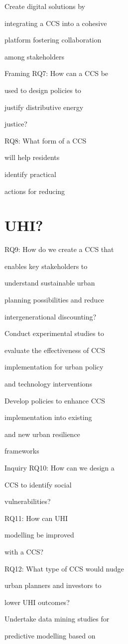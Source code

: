 \documentclass[10pt,a4paper]{article}
\begin{document}
Create digital solutions by

integrating a CCS into a cohesive

platform fostering collaboration

among stakeholders

Framing RQ7: How can a CCS be

used to design policies to

justify distributive energy

justice?

RQ8: What form of a CCS

will help residents

identify practical

actions for reducing


\section{UHI?}

RQ9: How do we create a CCS that

enables key stakeholders to

understand sustainable urban

planning possibilities and reduce

intergenerational discounting?

Conduct experimental studies to

evaluate the eﬀectiveness of CCS

implementation for urban policy

and technology interventions

Develop policies to enhance CCS

implementation into existing

and new urban resilience

frameworks

Inquiry RQ10: How can we design a

CCS to identify social

vulnerabilities?

RQ11: How can UHI

modelling be improved

with a CCS?

RQ12: What type of CCS would nudge

urban planners and investors to

lower UHI outcomes?

Undertake data mining studies for

predictive modelling based on
\end{document}
